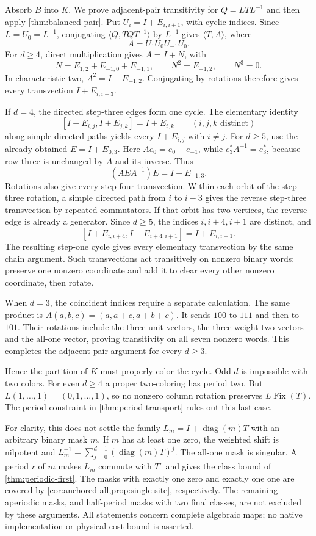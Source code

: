 \begin{outline}
Absorb $B$ into $K$.  We prove adjacent-pair transitivity for
$Q=LTL^{-1}$ and then apply \cref{thm:balanced-pair}.
Put $U_i=I+E_{i,i+1}$, with cyclic indices.  Since $L=U_0=L^{-1}$,
conjugating $\langle Q,TQT^{-1}\rangle$ by $L^{-1}$ gives
$\langle T,A\rangle$, where
\[
 A=U_1U_0U_{-1}U_0.
\]
For $d\ge4$, direct multiplication gives $A=I+N$, with
\[
 N=E_{1,2}+E_{-1,0}+E_{-1,1},\qquad
 N^2=E_{-1,2},\qquad N^3=0.
\]
In characteristic two, $A^2=I+E_{-1,2}$.  Conjugating by rotations
therefore gives every transvection $I+E_{i,i+3}$.

If $d=4$, the directed step-three edges form one cycle.  The elementary
identity
\[
 [I+E_{i,j},I+E_{j,k}]=I+E_{i,k}
 \qquad(i,j,k\text{ distinct})
\]
along simple directed paths yields every $I+E_{i,j}$ with $i\ne j$.
For $d\ge5$, use the already obtained $E=I+E_{0,3}$.
Here $Ae_0=e_0+e_{-1}$, while $e_3^*A^{-1}=e_3^*$, because row three
is unchanged by $A$ and its inverse.  Thus
\[
 (AEA^{-1})E=I+E_{-1,3}.
\]
Rotations also give every step-four transvection.  Within each orbit of
the step-three rotation, a simple directed path from $i$ to $i-3$
gives the reverse step-three transvection by repeated commutators.
If that orbit has two vertices, the reverse edge is already a generator.
Since $d\ge5$, the indices $i,i+4,i+1$ are distinct, and
\[
 [I+E_{i,i+4},I+E_{i+4,i+1}]=I+E_{i,i+1}.
\]
The resulting step-one cycle gives every elementary transvection by
the same chain argument.  Such transvections
act transitively on nonzero binary words: preserve one nonzero coordinate
and add it to clear every other nonzero coordinate, then rotate.

When $d=3$, the coincident indices require a separate calculation.
The same product is
$A(a,b,c)=(a,a+c,a+b+c)$.  It sends $100$ to $111$ and then to $101$.
Their rotations include the three unit vectors, the three weight-two
vectors and the all-one vector, proving transitivity on all seven
nonzero words.  This completes the adjacent-pair argument for every
$d\ge3$.

Hence the partition of $K$ must properly color the cycle.  Odd $d$
is impossible with two colors.  For even $d\ge4$ a proper two-coloring
has period two.  But $L(1,\ldots,1)=(0,1,\ldots,1)$, so no nonzero
column rotation preserves $L\operatorname{Fix}(T)$.  The period
constraint in \cref{thm:period-transport} rules out this last case.
\end{outline}

For clarity, this does not settle the family
$L_m=I+\operatorname{diag}(m)T$ with an arbitrary binary mask $m$.
If $m$ has at least one zero, the weighted shift is nilpotent and
$L_m^{-1}=\sum_{j=0}^{d-1}(\operatorname{diag}(m)T)^j$.
The all-one mask is singular.  A period $r$ of $m$ makes $L_m$ commute
with $T^r$ and gives the class bound of \cref{thm:periodic-first}.
The masks with exactly one zero and exactly one one are covered by
\cref{cor:anchored-all,prop:single-site}, respectively.  The remaining
aperiodic masks, and half-period masks with two final classes, are not
excluded by these arguments.  All statements concern complete algebraic
maps; no native implementation or physical cost bound is asserted.
